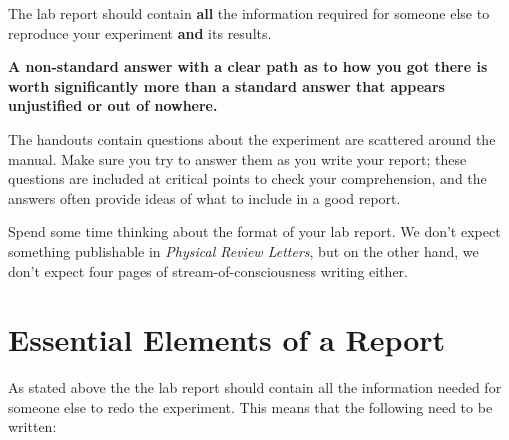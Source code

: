 \begin{imp}
The lab report should contain \textbf{all} the information required for someone else to reproduce your experiment \textbf{and} its results.

\textbf{A non-standard answer with a clear path as to how you got there is worth significantly more than a standard answer that appears unjustified or out of nowhere. }
\end{imp}

The handouts contain questions about the experiment are scattered around the manual. Make sure you try to answer them as you write your report; these questions are included at critical points to check your comprehension, and the answers often provide ideas of what to include in a good report. 

\begin{imp}
Spend some time thinking about the format of your lab report. We don't expect something publishable in \textit{Physical Review Letters}, but on the other hand, we don't expect four pages of stream-of-consciousness writing either.
\end{imp}

\section{Essential Elements of a Report}

As stated above the the lab report should contain all the information needed for someone else to redo the experiment. This means that the following need to be written:

